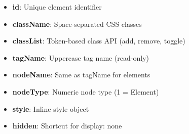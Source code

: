 \documentclass{report}
\begin{document}
\begin{itemize}
\begin{itemize}
                \item \textbf{id}: Unique element identifier
                \item \textbf{className}: Space-separated CSS classes
                \item \textbf{classList}: Token-based class API (add, remove, toggle)
                \item \textbf{tagName}: Uppercase tag name (read-only)
                \item \textbf{nodeName}: Same as tagName for elements
                \item \textbf{nodeType}: Numeric node type (1 = Element)
                \item \textbf{style}: Inline style object
                \item \textbf{hidden}: Shortcut for display: none
            \end{itemize}


    \end{itemize}



    \pagebreak 
\end{document}
